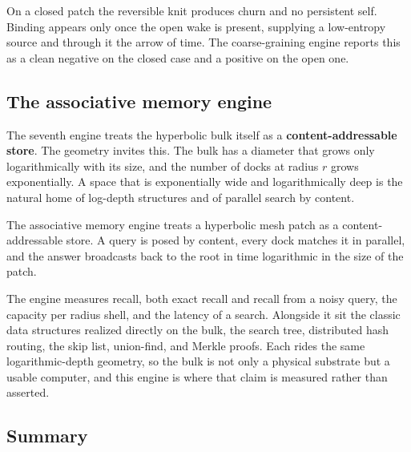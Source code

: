 \begin{result}
On a closed patch the reversible knit produces churn and no persistent self. Binding appears only once the open wake is present, supplying a low-entropy source and through it the arrow of time. The coarse-graining engine reports this as a clean negative on the closed case and a positive on the open one.
\end{result}

\subsection{The associative memory engine}

The seventh engine treats the hyperbolic bulk itself as a \textbf{content-addressable store}. The geometry invites this. The bulk has a diameter that grows only logarithmically with its size, and the number of docks at radius $r$ grows exponentially. A space that is exponentially wide and logarithmically deep is the natural home of log-depth structures and of parallel search by content.

\begin{definition}
The associative memory engine treats a hyperbolic mesh patch as a content-addressable store. A query is posed by content, every dock matches it in parallel, and the answer broadcasts back to the root in time logarithmic in the size of the patch.
\end{definition}

The engine measures recall, both exact recall and recall from a noisy query, the capacity per radius shell, and the latency of a search. Alongside it sit the classic data structures realized directly on the bulk, the search tree, distributed hash routing, the skip list, union-find, and Merkle proofs. Each rides the same logarithmic-depth geometry, so the bulk is not only a physical substrate but a usable computer, and this engine is where that claim is measured rather than asserted.

\subsection{Summary}

